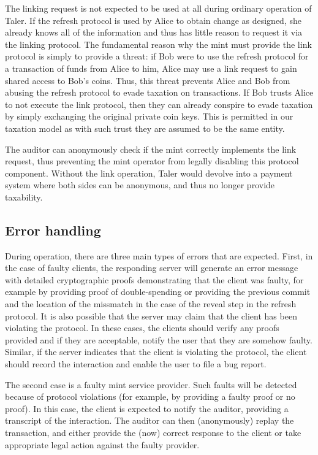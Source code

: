 \documentclass{llncs}
\begin{document}
The linking request is not expected to be used at all during ordinary
operation of Taler.  If the refresh protocol is used by Alice to
obtain change as designed, she already knows all of the information
and thus has little reason to request it via the linking protocol.
The fundamental reason why the mint must provide the link protocol is
simply to provide a threat: if Bob were to use the refresh protocol
for a transaction of funds from Alice to him, Alice may use a link
request to gain shared access to Bob's coins. Thus, this threat
prevents Alice and Bob from abusing the refresh protocol to evade
taxation on transactions. If Bob trusts Alice to not execute the link
protocol, then they can already conspire to evade taxation by simply
exchanging the original private coin keys.  This is permitted in our
taxation model as with such trust they are assumed to be the same
entity.

The auditor can anonymously check if the mint correctly implements the
link request, thus preventing the mint operator from legally disabling
this protocol component.  Without the link operation, Taler would
devolve into a payment system where both sides can be anonymous, and
thus no longer provide taxability.


\subsection{Error handling}

During operation, there are three main types of errors that are
expected.  First, in the case of faulty clients, the responding server
will generate an error message with detailed cryptographic proofs
demonstrating that the client was faulty, for example by providing
proof of double-spending or providing the previous commit and the
location of the missmatch in the case of the reveal step in the
refresh protocol.  It is also possible that the server may claim that
the client has been violating the protocol.  In these cases, the
clients should verify any proofs provided and if they are acceptable,
notify the user that they are somehow faulty.  Similar, if the
server indicates that the client is violating the protocol, the
client should record the interaction and enable the user to file a
bug report.

The second case is a faulty mint service provider.  Such faults will
be detected because of protocol violations (for example, by providing
a faulty proof or no proof).  In this case, the client is expected to
notify the auditor, providing a transcript of the interaction.  The
auditor can then (anonymously) replay the transaction, and either
provide the (now) correct response to the client or take appropriate
legal action against the faulty provider.
\end{document}
